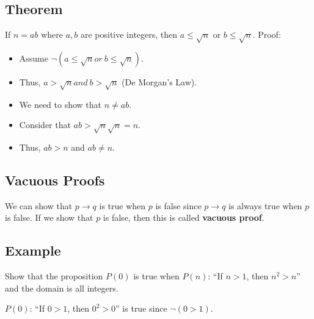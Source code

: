 \documentclass{math}
\begin{document}
\subsection*{Theorem}
If \( n = ab \) where \( a,b \) are positive integers, then \( a \leq \sqrt{n}
\) or \( b \leq \sqrt{n} \). Proof:
\begin{itemize}
  \item Assume \( \neg(a \leq \sqrt{n} or\ b \leq \sqrt{n}) \).
  \item Thus, \( a > \sqrt{n} and\ b > \sqrt{n} \) (De Morgan's Law).
  \item We need to show that \( n \neq ab \).
  \item Consider that \( ab > \sqrt{n}\sqrt{n} = n \).
  \item Thus, \( ab > n \) and \( ab \neq n \).
\end{itemize}

\subsection*{Vacuous Proofs}
We can show that \( p \to q \) is true when \( p \) is false since \( p \to q \)
is always true when \( p \) is false. If we show that \( p \) is false, then
this is called \textbf{vacuous proof}.

\subsection*{Example}
Show that the proposition \( P(0) \) is true when \( P(n) \): ``If \( n > 1 \),
then \( n^{2} > n \)'' and the domain is all integers. \par
\( P(0) \): ``If \( 0 > 1 \), then \( 0^{2} > 0 \)'' is true since
\( \neg{(0 > 1)} \).
\end{document}
